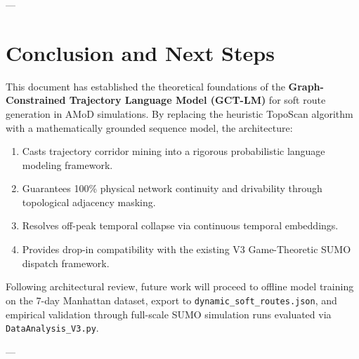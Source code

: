 \documentclass[12pt,a4paper]{article}
\begin{document}
---

\section{Conclusion and Next Steps}

This document has established the theoretical foundations of the \textbf{Graph-Constrained Trajectory Language Model (GCT-LM)} for soft route generation in AMoD simulations. By replacing the heuristic TopoScan algorithm with a mathematically grounded sequence model, the architecture:
\begin{enumerate}
    \item Casts trajectory corridor mining into a rigorous probabilistic language modeling framework.
    \item Guarantees 100\% physical network continuity and drivability through topological adjacency masking.
    \item Resolves off-peak temporal collapse via continuous temporal embeddings.
    \item Provides drop-in compatibility with the existing V3 Game-Theoretic SUMO dispatch framework.
\end{enumerate}

Following architectural review, future work will proceed to offline model training on the 7-day Manhattan dataset, export to \texttt{dynamic\_soft\_routes.json}, and empirical validation through full-scale SUMO simulation runs evaluated via \texttt{DataAnalysis\_V3.py}.

---
\end{document}
